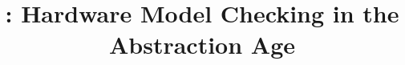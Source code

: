 \documentclass[acmsmall,screen,review]{acmart}
\begin{document}
\title[abstraction]{\toolname{}: Hardware Model Checking in the Abstraction Age}


\end{document}
